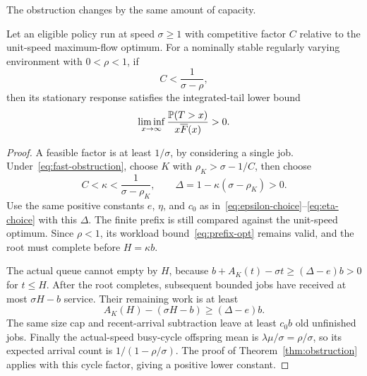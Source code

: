 The obstruction changes by the same amount of capacity.

\begin{proposition}\label{prop:speed-obstruction}
Let an eligible policy run at speed $\sigma\geq1$ with competitive factor $C$ relative to the unit-speed maximum-flow optimum. For a nominally stable regularly varying environment with $0<\rho<1$, if
\begin{equation}\label{eq:fast-obstruction}
 C<\frac1{\sigma-\rho},
\end{equation}
then its stationary response satisfies the integrated-tail lower bound
\[
 \liminf_{x\to\infty}\frac{\mathbb P(T>x)}{x\overline F(x)}>0.
\]
\end{proposition}
\begin{proof}
A feasible factor is at least $1/\sigma$, by considering a single job. Under~\eqref{eq:fast-obstruction}, choose $K$ with $\rho_K>\sigma-1/C$, then choose
\[
 C<\kappa<\frac1{\sigma-\rho_K},
 \qquad\Delta=1-\kappa(\sigma-\rho_K)>0.
\]
Use the same positive constants $e$, $\eta$, and $c_0$ as in~\eqref{eq:epsilon-choice}--\eqref{eq:eta-choice} with this $\Delta$. The finite prefix is still compared against the unit-speed optimum. Since $\rho<1$, its workload bound~\eqref{eq:prefix-opt} remains valid, and the root must complete before $H=\kappa b$.

The actual queue cannot empty by $H$, because $b+A_K(t)-\sigma t\geq(\Delta-e)b>0$ for $t\leq H$. After the root completes, subsequent bounded jobs have received at most $\sigma H-b$ service. Their remaining work is at least
\[
 A_K(H)-(\sigma H-b)\geq(\Delta-e)b.
\]
The same size cap and recent-arrival subtraction leave at least $c_0b$ old unfinished jobs. Finally the actual-speed busy-cycle offspring mean is $\lambda\mu/\sigma=\rho/\sigma$, so its expected arrival count is $1/(1-\rho/\sigma)$. The proof of Theorem~\ref{thm:obstruction} applies with this cycle factor, giving a positive lower constant.
\end{proof}

